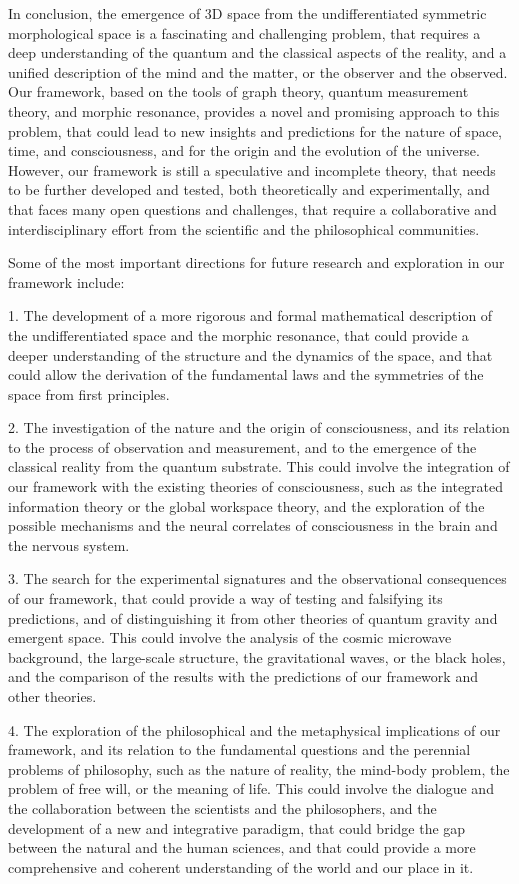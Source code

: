 In conclusion, the emergence of 3D space from the undifferentiated symmetric morphological space is a fascinating and challenging problem, that requires a deep understanding of the quantum and the classical aspects of the reality, and a unified description of the mind and the matter, or the observer and the observed. Our framework, based on the tools of graph theory, quantum measurement theory, and morphic resonance, provides a novel and promising approach to this problem, that could lead to new insights and predictions for the nature of space, time, and consciousness, and for the origin and the evolution of the universe. However, our framework is still a speculative and incomplete theory, that needs to be further developed and tested, both theoretically and experimentally, and that faces many open questions and challenges, that require a collaborative and interdisciplinary effort from the scientific and the philosophical communities.

Some of the most important directions for future research and exploration in our framework include:

1. The development of a more rigorous and formal mathematical description of the undifferentiated space and the morphic resonance, that could provide a deeper understanding of the structure and the dynamics of the space, and that could allow the derivation of the fundamental laws and the symmetries of the space from first principles.

2. The investigation of the nature and the origin of consciousness, and its relation to the process of observation and measurement, and to the emergence of the classical reality from the quantum substrate. This could involve the integration of our framework with the existing theories of consciousness, such as the integrated information theory or the global workspace theory, and the exploration of the possible mechanisms and the neural correlates of consciousness in the brain and the nervous system.

3. The search for the experimental signatures and the observational consequences of our framework, that could provide a way of testing and falsifying its predictions, and of distinguishing it from other theories of quantum gravity and emergent space. This could involve the analysis of the cosmic microwave background, the large-scale structure, the gravitational waves, or the black holes, and the comparison of the results with the predictions of our framework and other theories.

4. The exploration of the philosophical and the metaphysical implications of our framework, and its relation to the fundamental questions and the perennial problems of philosophy, such as the nature of reality, the mind-body problem, the problem of free will, or the meaning of life. This could involve the dialogue and the collaboration between the scientists and the philosophers, and the development of a new and integrative paradigm, that could bridge the gap between the natural and the human sciences, and that could provide a more comprehensive and coherent understanding of the world and our place in it.

